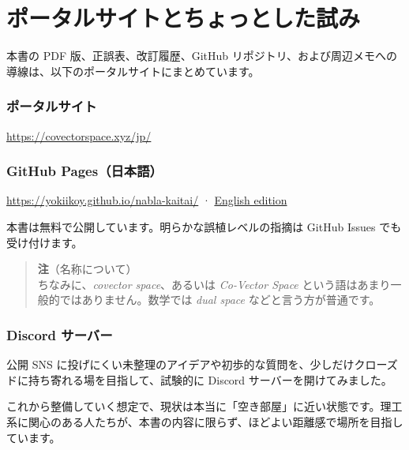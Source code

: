 \documentclass[a4paper,12pt,openany]{book}
\begin{document}
\newpage

\hypertarget{ux30ddux30fcux30bfux30ebux30b5ux30a4ux30c8ux3068ux3061ux3087ux3063ux3068ux3057ux305fux8a66ux307f}{%
\chapter{ポータルサイトとちょっとした試み}\label{ux30ddux30fcux30bfux30ebux30b5ux30a4ux30c8ux3068ux3061ux3087ux3063ux3068ux3057ux305fux8a66ux307f}}

本書の PDF 版、正誤表、改訂履歴、GitHub
リポジトリ、および周辺メモへの導線は、以下のポータルサイトにまとめています。

\hypertarget{ux30ddux30fcux30bfux30ebux30b5ux30a4ux30c8}{%
\subsection{ポータルサイト}\label{ux30ddux30fcux30bfux30ebux30b5ux30a4ux30c8}}

\url{https://covectorspace.xyz/jp/}

\hypertarget{github-pagesux65e5ux672cux8a9e}{%
\subsection{GitHub
Pages（日本語）}\label{github-pagesux65e5ux672cux8a9e}}

\url{https://yokiikoy.github.io/nabla-kaitai/} ·
\href{https://yokiikoy.github.io/nabla-kaitai/en/}{English edition}

本書は無料で公開しています。明らかな誤植レベルの指摘は GitHub Issues
でも受け付けます。

\begin{quote}
\textbf{注}（名称について）\\
ちなみに、\emph{covector space}、あるいは \emph{Co-Vector Space}
という語はあまり一般的ではありません。数学では \emph{dual space}
などと言う方が普通です。
\end{quote}

\hypertarget{discord-ux30b5ux30fcux30d0ux30fc}{%
\subsection{Discord サーバー}\label{discord-ux30b5ux30fcux30d0ux30fc}}

公開 SNS
に投げにくい未整理のアイデアや初歩的な質問を、少しだけクローズドに持ち寄れる場を目指して、試験的に
Discord サーバーを開けてみました。

これから整備していく想定で、現状は本当に「空き部屋」に近い状態です。理工系に関心のある人たちが、本書の内容に限らず、ほどよい距離感で場所を目指しています。
\end{document}

